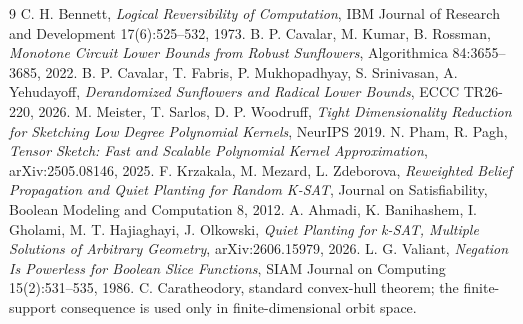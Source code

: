 \documentclass[11pt]{article}
\begin{document}
\begin{thebibliography}{9}
 C. H. Bennett, \emph{Logical Reversibility of Computation}, IBM Journal of Research and Development 17(6):525--532, 1973.
 B. P. Cavalar, M. Kumar, B. Rossman, \emph{Monotone Circuit Lower Bounds from Robust Sunflowers}, Algorithmica 84:3655--3685, 2022.
 B. P. Cavalar, T. Fabris, P. Mukhopadhyay, S. Srinivasan, A. Yehudayoff, \emph{Derandomized Sunflowers and Radical Lower Bounds}, ECCC TR26-220, 2026.
 M. Meister, T. Sarlos, D. P. Woodruff, \emph{Tight Dimensionality Reduction for Sketching Low Degree Polynomial Kernels}, NeurIPS 2019.
 N. Pham, R. Pagh, \emph{Tensor Sketch: Fast and Scalable Polynomial Kernel Approximation}, arXiv:2505.08146, 2025.
 F. Krzakala, M. Mezard, L. Zdeborova, \emph{Reweighted Belief Propagation and Quiet Planting for Random K-SAT}, Journal on Satisfiability, Boolean Modeling and Computation 8, 2012.
 A. Ahmadi, K. Banihashem, I. Gholami, M. T. Hajiaghayi, J. Olkowski, \emph{Quiet Planting for k-SAT, Multiple Solutions of Arbitrary Geometry}, arXiv:2606.15979, 2026.
 L. G. Valiant, \emph{Negation Is Powerless for Boolean Slice Functions}, SIAM Journal on Computing 15(2):531--535, 1986.
 C. Caratheodory, standard convex-hull theorem; the finite-support consequence is used only in finite-dimensional orbit space.
\end{thebibliography}
\end{document}
